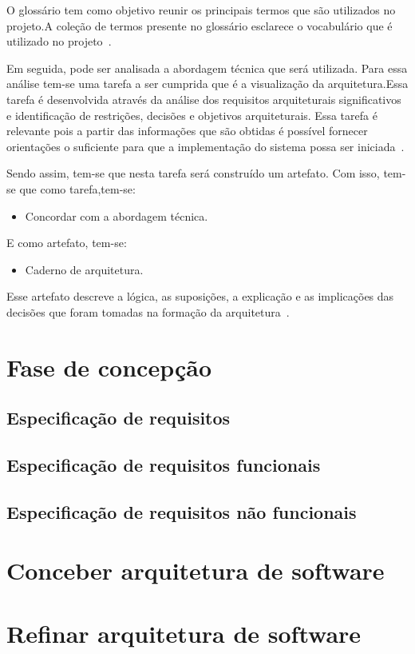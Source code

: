 O glossário tem como objetivo reunir os principais termos que são utilizados no projeto.A coleção de termos presente no glossário esclarece o vocabulário que é utilizado no projeto~\cite{openup}.  

Em seguida, pode ser analisada a abordagem técnica que será utilizada. Para essa análise tem-se uma tarefa a ser cumprida que é a visualização da arquitetura.Essa tarefa é desenvolvida através da análise dos requisitos arquiteturais significativos e identificação de restrições, decisões e objetivos arquiteturais. Essa tarefa é relevante pois a partir das informações que são obtidas é possível fornecer orientações o suficiente para que a implementação do sistema possa ser iniciada~\cite{openup}.

Sendo assim, tem-se que nesta tarefa será construído um artefato. Com isso, tem-se que como tarefa,tem-se:
\begin{itemize}
    \item Concordar com a abordagem técnica.
\end{itemize}
E como artefato, tem-se:
    \begin{itemize}
        \item Caderno de arquitetura.
    \end{itemize}
Esse artefato descreve a lógica, as suposições, a explicação e as implicações das decisões que foram tomadas na formação da arquitetura~\cite{openup}.

\section{Fase de concepção}
\subsection{Especificação de requisitos}
\subsection{Especificação de requisitos funcionais}
\subsection{Especificação de requisitos não funcionais}
\section{Conceber arquitetura de software}
\section{Refinar arquitetura de software}